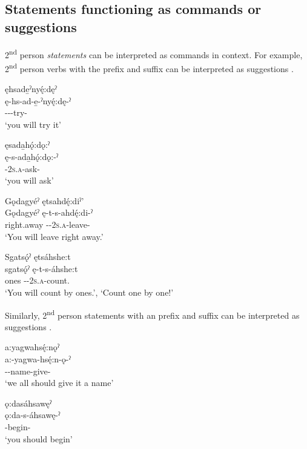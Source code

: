 \subsection{Statements functioning as commands or suggestions} \label{Statements functioning as commands or suggestions}
2\textsuperscript{nd} person \emph{statements} can be interpreted as commands in context. For example, 2\textsuperscript{nd} person verbs with the  {\future} prefix and  {\punctual} suffix can be interpreted as suggestions .

\ea\label{ex:commandex15} 
\ea ęhsade̱ˀnyę́:dęˀ\\
\gll ę-hs-ad-e̱-ˀnyę́:dę-ˀ\\
\fut--{\joinerE}-try-{\punctual}\\
\glt ‘you will try it’


\ex ęsada̱hǫ́:dǫ:ˀ\\
\gll ę-s-ada̱hǫ́:dǫ:-ˀ\\
 \fut-\textsc{2s.a}-ask-{\punctual}\\
\glt `you will ask'

\ex Gǫdagyéˀ ętsahdę́:diˀ’\\
\gll Gǫdagyéˀ ę-t-s-ahdę́:di-ˀ\\
right.away \fut-{\dualic}-\textsc{2s.a}-leave-{\punctual}\\
\glt  ‘You will leave right away.’

\ex Sgatsǫ́ˀ ętsáhshe:t  \\
\gll sgatsǫ́ˀ ę-t-s-áhshe:t\\
 ones \fut-{\dualic}-\textsc{2s.a}-count.{\zeropunctual}\\
\glt ‘You will count by ones.’, ‘Count one by one!’
\z
\z

Similarly, 2\textsuperscript{nd} person statements with an  {\indefinite} prefix and  {\punctual} suffix can be interpreted as suggestions .

\ea\label{ex:commandex150} {}
\ea a:yagwahsę́:nǫˀ\\
\gll a:-yagwa-hsę́:n-ǫ-ˀ\\
 {\indefinite}--name-give-{\punctual}\\
\glt `we all should give it a name'

\ex ǫ:dasáhsawęˀ\\
\gll ǫ:da-s-áhsawę-ˀ\\
 {\indefinitecislocative}-begin-{\punctual}\\
\glt `you should begin'


